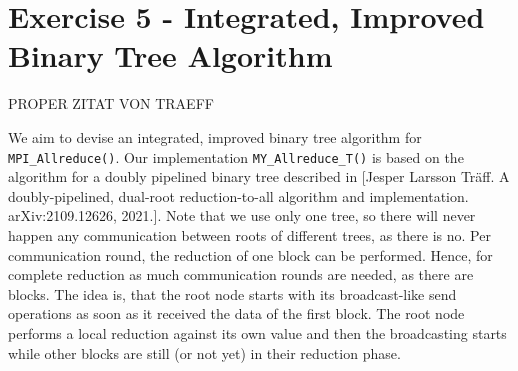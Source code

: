 \section{Exercise 5 - Integrated, Improved Binary Tree Algorithm}

PROPER ZITAT VON TRAEFF 

We aim to devise an integrated, improved binary tree algorithm for \texttt{MPI\_Allreduce()}. Our 
implementation \texttt{MY\_Allreduce\_T()} is based on the algorithm for a doubly pipelined binary 
tree described in [Jesper Larsson Träff. A doubly-pipelined, dual-root reduction-to-all algorithm and 
implementation. arXiv:2109.12626, 2021.]. Note that we use only one tree, so there will never happen any 
communication between roots of different trees, as there is no. Per communication round, the reduction of 
one block can be performed. Hence, for complete reduction as much communication rounds are needed, 
as there are blocks. The idea is, that the root node starts with its broadcast-like send operations 
as soon as it received the data of the first block. The root node performs a local reduction against 
its own value and then the broadcasting starts while other blocks are still (or not yet) 
in their reduction phase. \\


